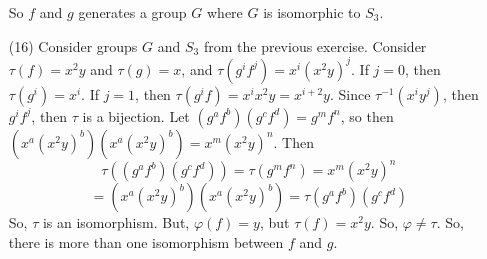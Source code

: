 \begin{itemize}
So $f$ and $g$ generates a group $G$ where $G$ is isomorphic to $S_3$.
\item[(16)]
Consider groups $G$ and $S_3$ from the previous exercise. Consider $\tau(f) = x^2y$ and $\tau(g) = x$, and $\tau(g^if^j) = x^i(x^2y)^j$. If $j = 0$, then $\tau(g^i) = x^i$. If $j = 1$, then $\tau(g^if) = x^ix^2y = x^{i+2}y$. Since $\tau^{-1}(x^iy^j)$, then $g^if^j$, then $\tau$ is a bijection. Let $(g^af^b)(g^cf^d) = g^mf^n$, so then $(x^a(x^2y)^b)(x^a(x^2y)^b) = x^m(x^2y)^n$. Then
$$\tau((g^af^b)(g^cf^d)) = \tau(g^mf^n) = x^m(x^2y)^n$$
$$= (x^a(x^2y)^b)(x^a(x^2y)^b) = \tau(g^af^b)(g^cf^d)$$
So, $\tau$ is an isomorphism. But, $\varphi(f) = y$, but $\tau(f) = x^2y$. So, $\varphi \neq \tau$. So, there is more than one isomorphism between $f$ and $g$.
\end{itemize}
%